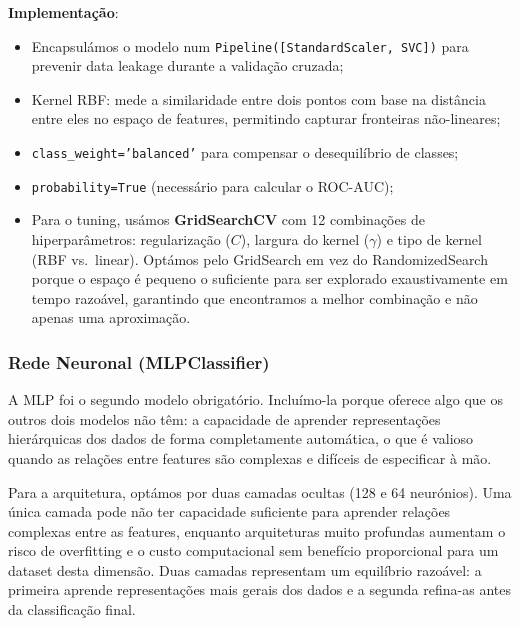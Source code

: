 \documentclass[12pt,a4paper]{article}
\begin{document}
\textbf{Implementação}:
\begin{itemize}
  \item Encapsulámos o modelo num \texttt{Pipeline([StandardScaler, SVC])} para prevenir
    data leakage durante a validação cruzada;
  \item Kernel RBF: mede a similaridade entre dois pontos com base na distância entre eles no espaço de features, permitindo capturar fronteiras não-lineares;
  \item \texttt{class\_weight='balanced'} para compensar o desequilíbrio de classes;
  \item \texttt{probability=True} (necessário para calcular o ROC-AUC);
  \item Para o tuning, usámos \textbf{GridSearchCV} com 12 combinações de
    hiperparâmetros: regularização ($C$), largura do kernel ($\gamma$) e tipo de kernel
    (RBF vs.\ linear). Optámos pelo GridSearch em vez do RandomizedSearch porque o espaço
    é pequeno o suficiente para ser explorado exaustivamente em tempo razoável, garantindo
    que encontramos a melhor combinação e não apenas uma aproximação.
\end{itemize}

\subsubsection{Rede Neuronal (MLPClassifier)}

A MLP \cite{rumelhart1986} foi o segundo modelo obrigatório. Incluímo-la porque oferece
algo que os outros dois modelos não têm: a capacidade de aprender representações
hierárquicas dos dados de forma completamente automática, o que é valioso quando as
relações entre features são complexas e difíceis de especificar à mão.

Para a arquitetura, optámos por duas camadas ocultas (128 e 64 neurónios).
Uma única camada pode não ter capacidade suficiente para aprender relações complexas
entre as features, enquanto arquiteturas muito profundas aumentam o risco de overfitting
e o custo computacional sem benefício proporcional para um dataset desta dimensão.
Duas camadas representam um equilíbrio razoável: a primeira aprende representações
mais gerais dos dados e a segunda refina-as antes da classificação final.
\end{document}
